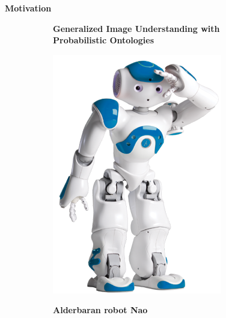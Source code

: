 \begin{frame}{\textbf{Motivation}}
\begin{figure}
\begin{subfigure}[c]{0.3\textwidth}
		\begin{scriptsize} \begin{center}
			\textbf{Generalized Image Understanding with Probabilistic Ontologies \footnotemark}
		\end{center} \end{scriptsize} 
    \end{subfigure}\hspace{1em}%
    \begin{subfigure}[c]{0.2\textwidth}
		\includegraphics[width=\textwidth]{./img/motivation2.png} 
		\begin{scriptsize} \begin{center}
		 \textbf{Alderbaran robot Nao \footnotemark}
		\end{center} \end{scriptsize} 
    \end{subfigure}%
    

\end{figure}


\end{frame}

